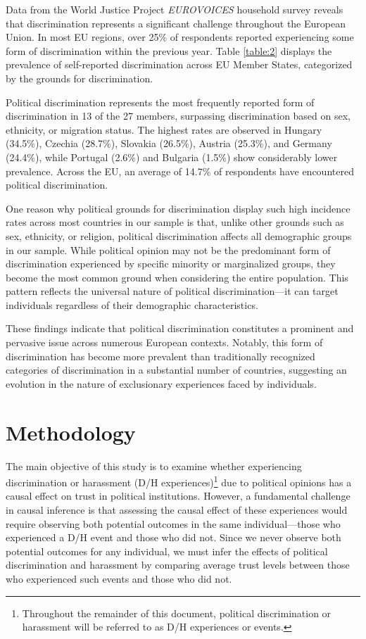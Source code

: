 \documentclass{article}
\begin{document}
Data from the World Justice Project \emph{EUROVOICES} household survey reveals that discrimination represents a significant challenge throughout the European Union. In most EU regions, over 25\% of respondents reported experiencing some form of discrimination within the previous year. Table \ref{table:2} displays the prevalence of self-reported discrimination across EU Member States, categorized by the grounds for discrimination.

Political discrimination represents the most frequently reported form of discrimination in 13 of the 27 members, surpassing discrimination based on sex, ethnicity, or migration status. The highest rates are observed in Hungary (34.5\%), Czechia (28.7\%), Slovakia (26.5\%), Austria (25.3\%), and Germany (24.4\%), while Portugal (2.6\%) and Bulgaria (1.5\%) show considerably lower prevalence. Across the EU, an average of 14.7\% of respondents have encountered political discrimination.

One reason why political grounds for discrimination display such high incidence rates across most countries in our sample is that, unlike other grounds such as sex, ethnicity, or religion, political discrimination affects all demographic groups in our sample. While political opinion may not be the predominant form of discrimination experienced by specific minority or marginalized groups, they become the most common ground when considering the entire population. This pattern reflects the universal nature of political discrimination—it can target individuals regardless of their demographic characteristics.

These findings indicate that political discrimination constitutes a prominent and pervasive issue across numerous European contexts. Notably, this form of discrimination has become more prevalent than traditionally recognized categories of discrimination in a substantial number of countries, suggesting an evolution in the nature of exclusionary experiences faced by individuals.



\section{Methodology}

The main objective of this study is to examine whether experiencing discrimination or harassment (D/H experiences)\footnote{Throughout the remainder of this document, political discrimination or harassment will be referred to as D/H experiences or events.} due to political opinions has a causal effect on trust in political institutions. However, a fundamental challenge in causal inference is that assessing the causal effect of these experiences would require observing both potential outcomes in the same individual—those who experienced a D/H event and those who did not. Since we never observe both potential outcomes for any individual, we must infer the effects of political discrimination and harassment by comparing average trust levels between those who experienced such events and those who did not.
\end{document}
